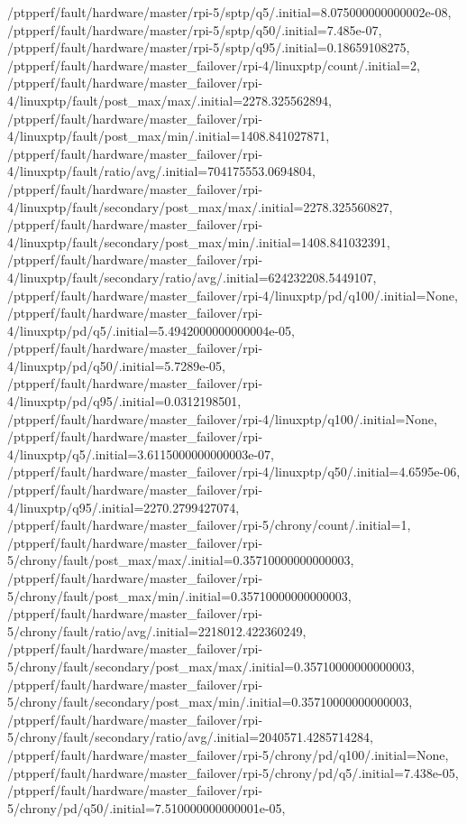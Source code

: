 {    /ptpperf/fault/hardware/master/rpi-5/sptp/q5/.initial=8.075000000000002e-08,
    /ptpperf/fault/hardware/master/rpi-5/sptp/q50/.initial=7.485e-07,
    /ptpperf/fault/hardware/master/rpi-5/sptp/q95/.initial=0.18659108275,
    /ptpperf/fault/hardware/master_failover/rpi-4/linuxptp/count/.initial=2,
    /ptpperf/fault/hardware/master_failover/rpi-4/linuxptp/fault/post_max/max/.initial=2278.325562894,
    /ptpperf/fault/hardware/master_failover/rpi-4/linuxptp/fault/post_max/min/.initial=1408.841027871,
    /ptpperf/fault/hardware/master_failover/rpi-4/linuxptp/fault/ratio/avg/.initial=704175553.0694804,
    /ptpperf/fault/hardware/master_failover/rpi-4/linuxptp/fault/secondary/post_max/max/.initial=2278.325560827,
    /ptpperf/fault/hardware/master_failover/rpi-4/linuxptp/fault/secondary/post_max/min/.initial=1408.841032391,
    /ptpperf/fault/hardware/master_failover/rpi-4/linuxptp/fault/secondary/ratio/avg/.initial=624232208.5449107,
    /ptpperf/fault/hardware/master_failover/rpi-4/linuxptp/pd/q100/.initial=None,
    /ptpperf/fault/hardware/master_failover/rpi-4/linuxptp/pd/q5/.initial=5.4942000000000004e-05,
    /ptpperf/fault/hardware/master_failover/rpi-4/linuxptp/pd/q50/.initial=5.7289e-05,
    /ptpperf/fault/hardware/master_failover/rpi-4/linuxptp/pd/q95/.initial=0.0312198501,
    /ptpperf/fault/hardware/master_failover/rpi-4/linuxptp/q100/.initial=None,
    /ptpperf/fault/hardware/master_failover/rpi-4/linuxptp/q5/.initial=3.6115000000000003e-07,
    /ptpperf/fault/hardware/master_failover/rpi-4/linuxptp/q50/.initial=4.6595e-06,
    /ptpperf/fault/hardware/master_failover/rpi-4/linuxptp/q95/.initial=2270.2799427074,
    /ptpperf/fault/hardware/master_failover/rpi-5/chrony/count/.initial=1,
    /ptpperf/fault/hardware/master_failover/rpi-5/chrony/fault/post_max/max/.initial=0.35710000000000003,
    /ptpperf/fault/hardware/master_failover/rpi-5/chrony/fault/post_max/min/.initial=0.35710000000000003,
    /ptpperf/fault/hardware/master_failover/rpi-5/chrony/fault/ratio/avg/.initial=2218012.422360249,
    /ptpperf/fault/hardware/master_failover/rpi-5/chrony/fault/secondary/post_max/max/.initial=0.35710000000000003,
    /ptpperf/fault/hardware/master_failover/rpi-5/chrony/fault/secondary/post_max/min/.initial=0.35710000000000003,
    /ptpperf/fault/hardware/master_failover/rpi-5/chrony/fault/secondary/ratio/avg/.initial=2040571.4285714284,
    /ptpperf/fault/hardware/master_failover/rpi-5/chrony/pd/q100/.initial=None,
    /ptpperf/fault/hardware/master_failover/rpi-5/chrony/pd/q5/.initial=7.438e-05,
    /ptpperf/fault/hardware/master_failover/rpi-5/chrony/pd/q50/.initial=7.510000000000001e-05,
}

